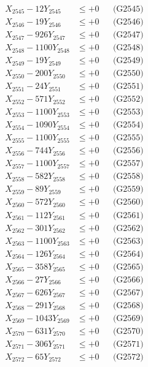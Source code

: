 \documentclass[a4paper,10pt]{article}
\begin{document}
{\begin{align}
X_{2545} - 12Y_{2545} &\leq +0 && \text{(G2545)} \\
X_{2546} - 19Y_{2546} &\leq +0 && \text{(G2546)} \\
X_{2547} - 926Y_{2547} &\leq +0 && \text{(G2547)} \\
X_{2548} - 1100Y_{2548} &\leq +0 && \text{(G2548)} \\
X_{2549} - 19Y_{2549} &\leq +0 && \text{(G2549)} \\
X_{2550} - 200Y_{2550} &\leq +0 && \text{(G2550)} \\
\allowbreak
X_{2551} - 24Y_{2551} &\leq +0 && \text{(G2551)} \\
X_{2552} - 571Y_{2552} &\leq +0 && \text{(G2552)} \\
X_{2553} - 1100Y_{2553} &\leq +0 && \text{(G2553)} \\
X_{2554} - 1090Y_{2554} &\leq +0 && \text{(G2554)} \\
X_{2555} - 1100Y_{2555} &\leq +0 && \text{(G2555)} \\
X_{2556} - 744Y_{2556} &\leq +0 && \text{(G2556)} \\
X_{2557} - 1100Y_{2557} &\leq +0 && \text{(G2557)} \\
X_{2558} - 582Y_{2558} &\leq +0 && \text{(G2558)} \\
X_{2559} - 89Y_{2559} &\leq +0 && \text{(G2559)} \\
X_{2560} - 572Y_{2560} &\leq +0 && \text{(G2560)} \\
\allowbreak
X_{2561} - 112Y_{2561} &\leq +0 && \text{(G2561)} \\
X_{2562} - 301Y_{2562} &\leq +0 && \text{(G2562)} \\
X_{2563} - 1100Y_{2563} &\leq +0 && \text{(G2563)} \\
X_{2564} - 126Y_{2564} &\leq +0 && \text{(G2564)} \\
X_{2565} - 358Y_{2565} &\leq +0 && \text{(G2565)} \\
X_{2566} - 27Y_{2566} &\leq +0 && \text{(G2566)} \\
X_{2567} - 626Y_{2567} &\leq +0 && \text{(G2567)} \\
X_{2568} - 291Y_{2568} &\leq +0 && \text{(G2568)} \\
X_{2569} - 1043Y_{2569} &\leq +0 && \text{(G2569)} \\
X_{2570} - 631Y_{2570} &\leq +0 && \text{(G2570)} \\
\allowbreak
X_{2571} - 306Y_{2571} &\leq +0 && \text{(G2571)} \\
X_{2572} - 65Y_{2572} &\leq +0 && \text{(G2572)} \\

\end{align}}
\end{document}
